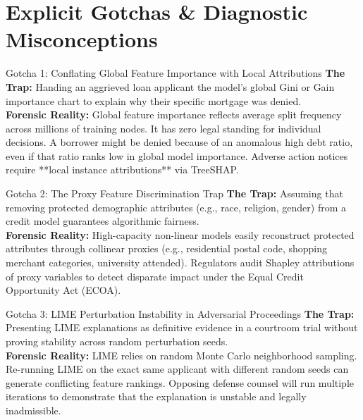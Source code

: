 \section{Explicit Gotchas \& Diagnostic Misconceptions}

\begin{trapbox}{Gotcha 1: Conflating Global Feature Importance with Local Attributions}
\textbf{The Trap:} Handing an aggrieved loan applicant the model's global Gini or Gain importance chart to explain why their specific mortgage was denied.\\
\textbf{Forensic Reality:} Global feature importance reflects average split frequency across millions of training nodes. It has zero legal standing for individual decisions. A borrower might be denied because of an anomalous high debt ratio, even if that ratio ranks low in global model importance. Adverse action notices require **local instance attributions** via TreeSHAP.
\end{trapbox}

\begin{trapbox}{Gotcha 2: The Proxy Feature Discrimination Trap}
\textbf{The Trap:} Assuming that removing protected demographic attributes (e.g., race, religion, gender) from a credit model guarantees algorithmic fairness.\\
\textbf{Forensic Reality:} High-capacity non-linear models easily reconstruct protected attributes through collinear proxies (e.g., residential postal code, shopping merchant categories, university attended). Regulators audit Shapley attributions of proxy variables to detect disparate impact under the Equal Credit Opportunity Act (ECOA).
\end{trapbox}

\begin{trapbox}{Gotcha 3: LIME Perturbation Instability in Adversarial Proceedings}
\textbf{The Trap:} Presenting LIME explanations as definitive evidence in a courtroom trial without proving stability across random perturbation seeds.\\
\textbf{Forensic Reality:} LIME relies on random Monte Carlo neighborhood sampling. Re-running LIME on the exact same applicant with different random seeds can generate conflicting feature rankings. Opposing defense counsel will run multiple iterations to demonstrate that the explanation is unstable and legally inadmissible.
\end{trapbox}

